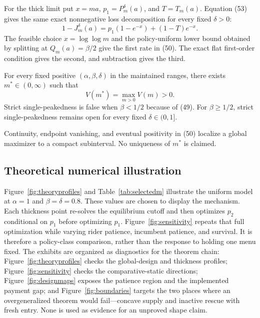 \documentclass[mnsc,blindrev]{informs3}
\begin{document}
For the thick limit put $x=ma$, $p_1=P_m^\delta(a)$, and $T=T_m(a)$.  Equation
(53) gives the same exact nonnegative loss decomposition for every fixed
$\delta>0$:
\[
 1-J_m^\delta(a)=p_1(1-e^{-x})+(1-T)e^{-x}.                \tag{55}
\]
The feasible choice $x=\log\log m$ and the policy-uniform lower bound obtained
by splitting at $Q_m(a)=\beta/2$ give the first rate in (50).  The exact flat
first-order condition gives the second, and subtraction gives the third.

\begin{corollary}
\label{cor:bestm}
For every fixed positive $(\alpha,\beta,\delta)$ in the maintained ranges,
there exists $m^*\in(0,\infty)$ such that
\[
 V(m^*)=\max_{m>0}V(m)>0.                                 \tag{56}
\]
Strict single-peakedness is false when $\beta<1/2$ because of (49).  For
$\beta\ge1/2$, strict single-peakedness remains open for every fixed
$\delta\in(0,1]$.
\end{corollary}

Continuity, endpoint vanishing, and eventual positivity in (50) localize a
global maximizer to a compact subinterval.  No uniqueness of $m^*$ is claimed.

\subsection{Theoretical numerical illustration}

Figure~\ref{fig:theoryprofiles} and Table~\ref{tab:selectedm} illustrate the
uniform model at $\alpha=1$ and $\beta=\delta=0.8$.  These values are chosen
to display the mechanism.  Each thickness point re-solves the equilibrium
cutoff and then optimizes $p_2$ conditional on $p_1$ before optimizing $p_1$.
Figure~\ref{fig:sensitivity} repeats that full optimization while varying
rider patience, incumbent patience, and survival.  It is therefore a
policy-class comparison, rather than the response to holding one menu fixed.
The exhibits are organized as diagnostics for the theorem chain:
Figure~\ref{fig:theoryprofiles} checks the global-design and thickness
profiles; Figure~\ref{fig:sensitivity} checks the comparative-static
directions; Figure~\ref{fig:designmaps} exposes the patience region and the
implemented payment gap; and Figure~\ref{fig:boundaries} targets the two
places where an overgeneralized theorem would fail---concave supply and
inactive rescue with fresh entry.  None is used as evidence for an unproved
shape claim.
\end{document}

